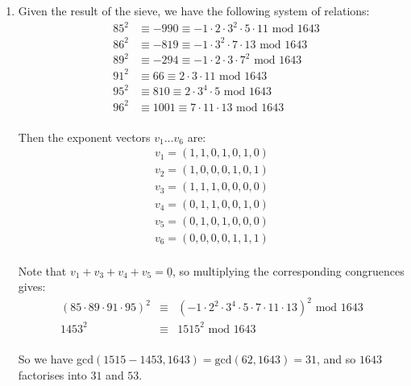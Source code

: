 \begin{enumerate}
\item Given the result of the sieve, we have the following system of relations:
  \begin{eqnarray*}
    &85^2& \equiv -990 \equiv -1 \cdot 2 \cdot 3^2 \cdot 5 \cdot 11
    \textrm{ mod } 1643 \\
    &86^2& \equiv -819 \equiv -1 \cdot 3^2 \cdot 7 \cdot 13
    \textrm{ mod } 1643 \\
    &89^2& \equiv -294 \equiv -1 \cdot 2 \cdot 3 \cdot 7^2
    \textrm{ mod } 1643 \\
    &91^2& \equiv 66 \equiv 2 \cdot 3 \cdot 11
    \textrm{ mod } 1643 \\
    &95^2& \equiv 810 \equiv 2 \cdot 3^4 \cdot 5
    \textrm{ mod } 1643 \\
    &96^2& \equiv 1001 \equiv 7 \cdot 11 \cdot 13
    \textrm{ mod } 1643 \\
  \end{eqnarray*}

  Then the exponent vectors $v_1 \dots v_6$ are:
  \begin{eqnarray*}
    v_1 = (1, 1, 0, 1, 0, 1, 0) \\
    v_2 = (1, 0, 0, 0, 1, 0, 1) \\
    v_3 = (1, 1, 1, 0, 0, 0, 0) \\
    v_4 = (0, 1, 1, 0, 0, 1, 0) \\
    v_5 = (0, 1, 0, 1, 0, 0, 0) \\
    v_6 = (0, 0, 0, 0, 1, 1, 1) \\
  \end{eqnarray*}

  Note that $v_1 + v_3 + v_4 + v_5 = \underline{0}$, so multiplying the
  corresponding congruences gives:
  \begin{eqnarray*}
    (85 \cdot 89 \cdot 91 \cdot 95)^2 &\equiv& (-1 \cdot 2^2 \cdot 3^4 \cdot 5
    \cdot 7 \cdot 11 \cdot 13)^2 \textrm{ mod } 1643 \\
    1453^2 &\equiv& 1515^2 \textrm{ mod } 1643 \\
  \end{eqnarray*}

  So we have gcd$(1515-1453, 1643) = \textrm{gcd}(62, 1643) = 31$, and so $1643$ factorises into $31$ and $53$.

\end{enumerate}
